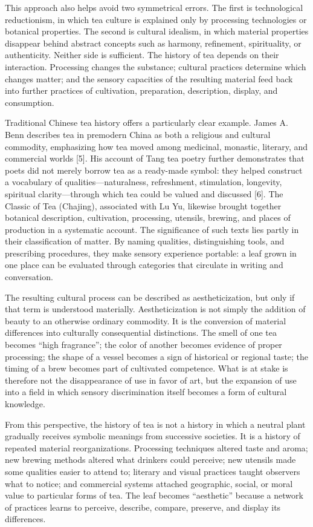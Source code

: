 \documentclass[11pt,a4paper]{article}
\begin{document}
This approach also helps avoid two symmetrical errors. The first is technological reductionism, in which tea culture is explained only by processing technologies or botanical properties. The second is cultural idealism, in which material properties disappear behind abstract concepts such as harmony, refinement, spirituality, or authenticity. Neither side is sufficient. The history of tea depends on their interaction. Processing changes the substance; cultural practices determine which changes matter; and the sensory capacities of the resulting material feed back into further practices of cultivation, preparation, description, display, and consumption.

Traditional Chinese tea history offers a particularly clear example. James A. Benn describes tea in premodern China as both a religious and cultural commodity, emphasizing how tea moved among medicinal, monastic, literary, and commercial worlds [5]. His account of Tang tea poetry further demonstrates that poets did not merely borrow tea as a ready-made symbol: they helped construct a vocabulary of qualities---naturalness, refreshment, stimulation, longevity, spiritual clarity---through which tea could be valued and discussed [6]. The Classic of Tea (Chajing), associated with Lu Yu, likewise brought together botanical description, cultivation, processing, utensils, brewing, and places of production in a systematic account. The significance of such texts lies partly in their classification of matter. By naming qualities, distinguishing tools, and prescribing procedures, they make sensory experience portable: a leaf grown in one place can be evaluated through categories that circulate in writing and conversation.

The resulting cultural process can be described as aestheticization, but only if that term is understood materially. Aestheticization is not simply the addition of beauty to an otherwise ordinary commodity. It is the conversion of material differences into culturally consequential distinctions. The smell of one tea becomes ``high fragrance''; the color of another becomes evidence of proper processing; the shape of a vessel becomes a sign of historical or regional taste; the timing of a brew becomes part of cultivated competence. What is at stake is therefore not the disappearance of use in favor of art, but the expansion of use into a field in which sensory discrimination itself becomes a form of cultural knowledge.

From this perspective, the history of tea is not a history in which a neutral plant gradually receives symbolic meanings from successive societies. It is a history of repeated material reorganizations. Processing techniques altered taste and aroma; new brewing methods altered what drinkers could perceive; new utensils made some qualities easier to attend to; literary and visual practices taught observers what to notice; and commercial systems attached geographic, social, or moral value to particular forms of tea. The leaf becomes ``aesthetic'' because a network of practices learns to perceive, describe, compare, preserve, and display its differences.
\end{document}
